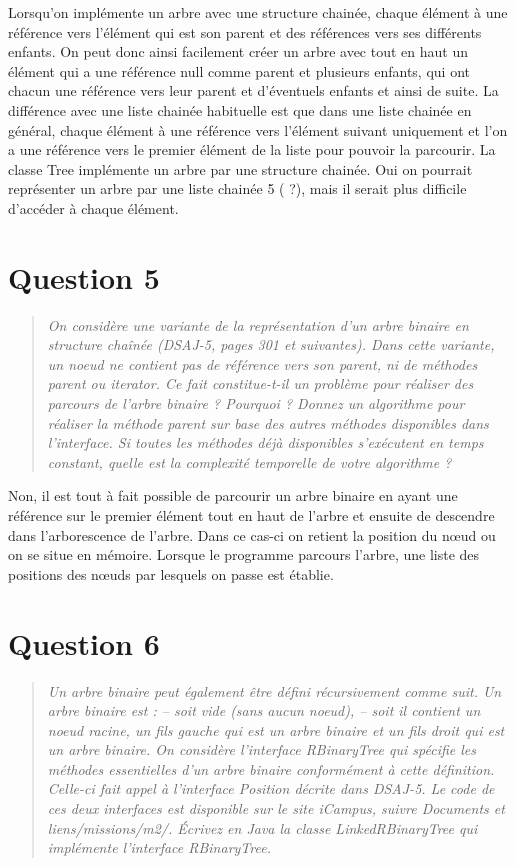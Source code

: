 \documentclass[11pt,a4paper]{article}
\begin{document}
Lorsqu’on implémente un arbre avec une structure chainée, chaque élément à une référence vers l’élément qui est son parent et des références vers ses différents enfants. On peut donc ainsi facilement créer un arbre avec tout en haut un élément qui a une référence null comme parent et plusieurs enfants, qui ont chacun une référence vers leur parent et d’éventuels enfants et ainsi de suite.
La différence avec une liste chainée habituelle est que dans une liste chainée en général, chaque élément à une référence vers l’élément suivant uniquement et l’on a une référence vers le premier élément de la liste pour pouvoir la parcourir.
La classe Tree implémente un arbre par une structure chainée. Oui on pourrait représenter un arbre par une liste chainée 5 ( ?), mais il serait plus difficile d’accéder à chaque élément.

\section{Question 5}
\begin{quotation}
\color{gray}\textit{On considère une variante de la représentation d’un arbre binaire en structure
chaînée (DSAJ-5, pages 301 et suivantes). Dans cette variante, un noeud ne contient pas de référence vers son parent, ni de méthodes parent ou iterator.
Ce fait constitue-t-il un problème pour réaliser des parcours de l’arbre binaire ?
Pourquoi ?
Donnez un algorithme pour réaliser la méthode parent sur base des autres méthodes disponibles dans l’interface. Si toutes les méthodes déjà disponibles s’exécutent en temps constant, quelle est la complexité temporelle de votre algorithme ?}
\end{quotation}

Non, il est tout à fait possible de parcourir un arbre binaire en ayant une référence sur le premier élément tout en haut de l’arbre et ensuite de descendre dans l’arborescence de l’arbre. Dans ce cas-ci on retient la position du nœud ou on se situe en mémoire. Lorsque le programme parcours l’arbre, une liste des positions des nœuds par lesquels on passe est établie.

%
\section{Question 6}
\begin{quotation}
\color{gray}\textit{Un arbre binaire peut également être défini récursivement comme suit. Un arbre
binaire est :
– soit vide (sans aucun noeud),
– soit il contient un noeud racine, un fils gauche qui est un arbre binaire et un fils
droit qui est un arbre binaire.
On considère l’interface RBinaryTree qui spécifie les méthodes essentielles
d’un arbre binaire conformément à cette définition. Celle-ci fait appel à l’interface
Position décrite dans DSAJ-5. Le code de ces deux interfaces est disponible
sur le site iCampus, suivre Documents et liens/missions/m2/.
Écrivez en Java la classe LinkedRBinaryTree qui implémente l’interface
RBinaryTree.}
\end{quotation}
\end{document}
